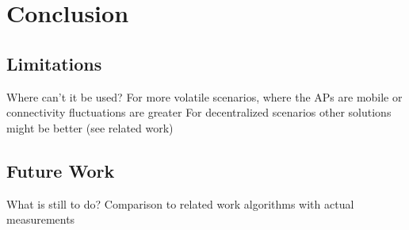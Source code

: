 \chapter{Conclusion}
\section{Limitations}
  Where can't it be used?\newline
    For more volatile scenarios, where the APs are mobile or connectivity fluctuations are greater \newline
    For decentralized scenarios other solutions might be better (see related work) \newline
\section{Future Work}
  What is still to do?\newline
    Comparison to related work algorithms with actual measurements\newline
